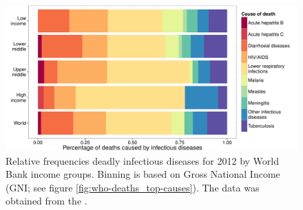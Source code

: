 \begin{knitrout}
\color{fgcolor}\begin{figure}
\includegraphics[width=\maxwidth]{figures/R/who-deaths/byDisease-who-deaths_by-disease-1} \caption[Relative frequencies deadly infectious diseases for 2012 by World Bank income groups]{Relative frequencies deadly infectious diseases for 2012 by World Bank income groups. Binning is based on Gross National Income (GNI; see figure \ref{fig:who-deaths_top-causes}). The data was obtained from the \cite{WHO2012}.}\label{fig:who-deaths_by-disease}
\end{figure}


\end{knitrout}

\newcommand{\knitrPercentageInfectTwelveWorldLRI}{34.5\%}
\newcommand{\knitrPercentageInfectTwelveHighLRI}{57.7\%}
\newcommand{\knitrPercentageInfectTwelveUmidLRI}{43.5\%}
\newcommand{\knitrPercentageInfectTwelveLmidLRI}{30.8\%}
\newcommand{\knitrPercentageInfectTwelveLowLRI}{28.7\%}
\newcommand{\knitrPercentageInfectTwelveHighDiarr}{5.6\%}
\newcommand{\knitrPercentageInfectTwelveUmidDiarr}{7\%}
\newcommand{\knitrPercentageInfectTwelveLmidDiarr}{21.4\%}
\newcommand{\knitrPercentageInfectTwelveLowDiarr}{16.6\%}
\newcommand{\knitrPercentageInfectTwelveWorldAIDS}{17.3\%}
\newcommand{\knitrPercentageInfectTwelveWorldDiarr}{16.9\%}
\newcommand{\knitrPercentageInfectTwelveHighAIDS}{11.3\%}
\newcommand{\knitrPercentageInfectTwelveUmidAIDS}{26.2\%}
\newcommand{\knitrPercentageInfectTwelveLmidAIDS}{13.3\%}
\newcommand{\knitrPercentageInfectTwelveLowAIDS}{20.4\%}
